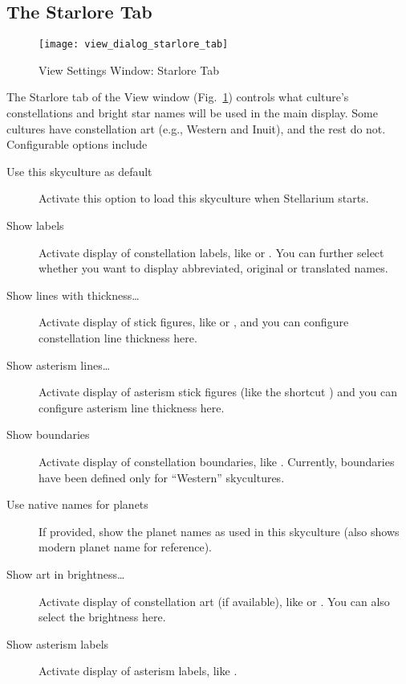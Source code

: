 \subsection{The Starlore Tab}
\label{sec:gui:view:starlore}

\begin{figure}[t]
\centering\texttt{[image: view\_dialog\_starlore\_tab]}
\caption{View Settings Window: Starlore Tab}
\label{fig:gui:view:starlore}
\end{figure}

The Starlore tab of the View window (Fig.~\ref{fig:gui:view:starlore})
controls what culture's constellations and bright star names will be
used in the main display.  Some cultures have constellation art (e.g.,
Western and Inuit), and the rest do not. Configurable options include
\begin{description}
\item[Use this skyculture as default] Activate this option to load
  this skyculture when Stellarium starts.
\item[Show labels] Activate display of constellation labels, like
   or . You can further
  select whether you want to display abbreviated, original or
  translated names.
\item[Show lines with thickness\ldots] Activate display of stick
  figures, like  or , and you
  can configure constellation line thickness here.
  \item[Show asterism lines\ldots] Activate display of asterism stick figures   
  (like the shortcut ) and you can configure asterism line thickness here.
\item[Show boundaries] Activate display of constellation boundaries,
  like . Currently, boundaries have been defined only for
  ``Western'' skycultures.
\item[Use native names for planets] If provided, show the planet names
  as used in this skyculture (also shows modern planet name for
  reference). %
\item[Show art in brightness\ldots] Activate display of constellation
  art (if available), like  or
  . You can also select the brightness here.
\item[Show asterism labels] Activate display of asterism labels, like .
\end{description}


